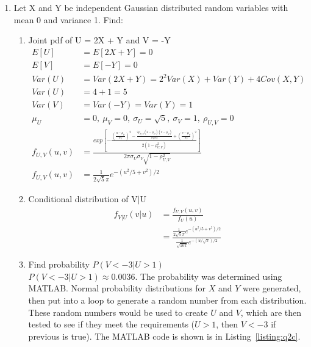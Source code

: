 \documentclass[12pt]{article}
\begin{document}
\begin{enumerate}
    \item Let X and Y be independent Gaussian distributed random variables with mean 0 and variance 1. Find:
    \begin{enumerate}
        \item Joint pdf of U = 2X + Y and V = -Y
        \begin{equation*}
        \begin{aligned}
            E[U] &= E[2X + Y] = 0 \\
            E[V] &= E[-Y] = 0 \\
            Var(U) &= Var(2X + Y) = 2^2Var(X) + Var(Y) + 4Cov(X,Y) \\
            Var(U) &= 4 + 1 = 5 \\
            Var(V) &= Var(-Y) = Var(Y) = 1 \\
            \mu_U &= 0, ~\mu_V = 0, ~\sigma_U = \sqrt{5}, ~\sigma_V = 1, ~\rho_{U,V} = 0 \\
            f_{U,V}(u,v) &= \frac{exp\left[-\frac{\left(\frac{u-\mu_U}{\sigma_U}\right)^2-\frac{2\rho_{U,V}(u-\mu_U)(v-\mu_V)}{\sigma_U\sigma_V}+\left(\frac{v-\mu_V}{\sigma_V}\right)^2}{2(1-\rho^2_{U,V})}\right]}{2\pi\sigma_U\sigma_V\sqrt{1-\rho^2_{U,V}}} \\
            f_{U,V}(u,v) &= \frac{1}{2\sqrt{5}\pi} e^{-(u^2/5 + v^2)/2}
        \end{aligned}
        \end{equation*}
        \item Conditional distribution of V$|$U
        \begin{equation*}
        \begin{aligned}
            f_{V|U}(v|u) &= \frac{f_{U,V}(u,v)}{f_U(u)} \\
            &= \frac{\frac{1}{2\sqrt{5}\pi} e^{-(u^2/5 + v^2)/2}}{\frac{1}{\sqrt{10\pi}}e^{-(u/\sqrt{5})/2}}
        \end{aligned}
        \end{equation*}
        \item Find probability $P(V<-3|U>1)$ \\
        $P(V<-3|U>1) \approx 0.0036$. The probability was determined using MATLAB. Normal probability distributions for $X$ and $Y$ were generated, then put into a loop to generate a random number from each distribution. These random numbers would be used to create $U$ and $V$, which are then tested to see if they meet the requirements ($U>1$, then $V<-3$ if previous is true). The MATLAB code is shown is in Listing~\ref{listing:q2c}.
        
    \end{enumerate}
    

\end{enumerate}
\end{document}
